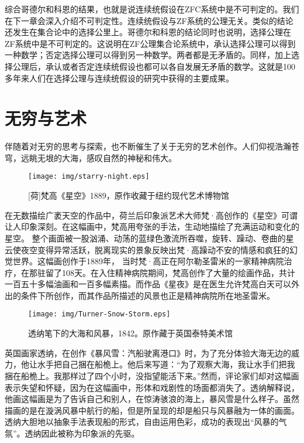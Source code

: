 \documentclass{article}
\begin{document}
综合哥德尔和科恩的结果，也就是说连续统假设在ZFC系统中是不可判定的。我们在下一章会深入介绍不可判定性。连续统假设与ZF系统的公理无关。类似的结论还发生在集合论中的选择公里上。哥德尔和科恩的结论同时也说明，选择公理在ZF系统中是不可判定的。这说明在ZF公理集合论系统中，承认选择公理可以得到一种数学；否定选择公理可以得到另一种数学。两者都是无矛盾的。同样，加上选择公理后，承认或者否定连续统假设也都可以各自发展无矛盾的数学。这就是100多年来人们在选择公理与连续统假设的研究中获得的主要成果。

\section{无穷与艺术}

伴随着对无穷的思考与探索，也不断催生了关于无穷的艺术创作。人们仰视浩瀚苍穹，远眺无垠的大海，感叹自然的神秘和伟大。

\begin{figure}[htbp]
 \centering
 \texttt{[image: img/starry-night.eps]}
 \captionsetup{labelformat=empty}
 \caption{[荷]梵高《星空》1889，原作收藏于纽约现代艺术博物馆}
 \label{fig:starry-night}
\end{figure}

在无数描绘广袤天空的作品中，荷兰后印象派艺术大师梵·高创作的《星空》可谓让人印象深刻。在这幅画中，梵高用夸张的手法，生动地描绘了充满运动和变化的星空。 整个画面被一股汹涌、动荡的蓝绿色激流所吞噬，旋转、躁动、卷曲的星云使夜空变得异常活跃，脱离现实的景象反映出梵·高躁动不安的情感和疯狂的幻觉世界。这幅画创作于1889年，
当时梵·高正在阿尔勒圣雷米的一家精神病院治疗，在那驻留了108天。在入住精神病院期间，梵高创作了大量的绘画作品，共计一百五十多幅油画和一百多幅素描。而作品《星夜》是在医生允许梵高白天可以外出的条件下所创作，而其作品所描述的风景也正是精神病院所在地圣雷米。

\begin{figure}[htbp]
 \centering
 \texttt{[image: img/Turner-Snow-Storm.eps]}
 \captionsetup{labelformat=empty}
 \caption{透纳笔下的大海和风暴，1842。原作藏于英国泰特美术馆}
 \label{fig:Turner-Snow-Storm}
\end{figure}

英国画家透纳，在创作《暴风雪：汽船驶离港口》时，为了充分体验大海无边的威力，他让水手把自己捆在船桅上。他后来写道：“为了观察大海，我让水手们把我捆在船桅上。我那样过了四个小时，没指望能活下来。”然而，评论家们却对这幅画表示失望和怀疑，因为在这幅画中，形体和戏剧性的场面都消失了。透纳解释说，他画这幅画是为了告诉自己和别人，在惊涛骇浪的海上，暴风雪是什么样子。虽然描画的是在漩涡风暴中航行的船，但是所呈现的却是船只与风暴融为一体的画面。透纳大胆地以抽象手法表现船的形式，自由运用色彩，成功的表现出“风暴的气氛”。透纳因此被称为印象派的先驱。
\end{document}

